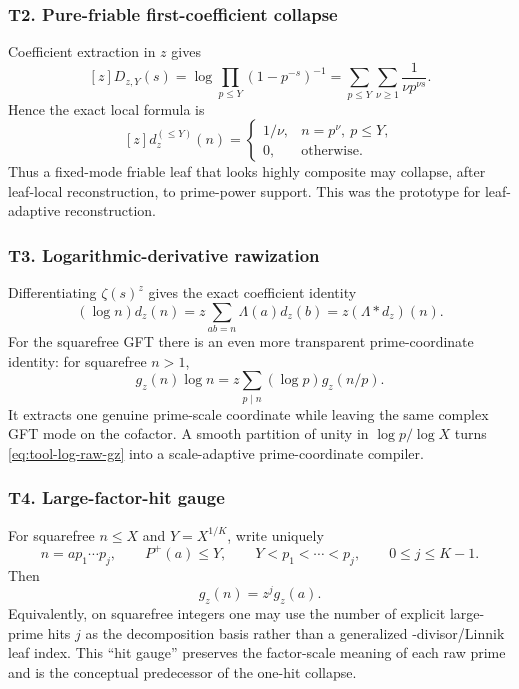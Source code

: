 \documentclass[11pt]{article}
\theoremstyle{definition}
\theoremstyle{remark}
\newcommand{\1}{\mathbf 1}
\begin{document}
\subsubsection*{T2. Pure-friable first-coefficient collapse}

Coefficient extraction in \(z\) gives
\[
 [z]D_{z,Y}(s)=\log\prod_{p\le Y}(1-p^{-s})^{-1}
 =\sum_{p\le Y}\sum_{\nu\ge1}\frac{1}{\nu p^{\nu s}}.
\]
Hence the exact local formula is
\begin{equation}\label{eq:tool-pure-friable-coeff}
 [z]d_z^{(\le Y)}(n)
 =
 \begin{cases}
  1/\nu,& n=p^\nu,\ p\le Y,\\
  0,&\text{otherwise}.
 \end{cases}
\end{equation}
Thus a fixed-mode friable leaf that looks highly composite may collapse, after
leaf-local reconstruction, to prime-power support.  This was the prototype for
leaf-adaptive reconstruction.

\subsubsection*{T3. Logarithmic-derivative rawization}

Differentiating \(\zeta(s)^z\) gives the exact coefficient identity
\begin{equation}\label{eq:tool-log-raw-dz}
 (\log n)d_z(n)
 =z\sum_{ab=n}\Lambda(a)d_z(b)
 =z(\Lambda*d_z)(n).
\end{equation}
For the squarefree GFT there is an even more transparent prime-coordinate
identity: for squarefree \(n>1\),
\begin{equation}\label{eq:tool-log-raw-gz}
 g_z(n)\log n
 =z\sum_{p\mid n}(\log p)g_z(n/p).
\end{equation}
It extracts one genuine prime-scale coordinate while leaving the same complex
GFT mode on the cofactor.  A smooth partition of unity in \(\log p/\log X\)
turns \eqref{eq:tool-log-raw-gz} into a scale-adaptive prime-coordinate
compiler.

\subsubsection*{T4. Large-factor-hit gauge}

For squarefree \(n\le X\) and \(Y=X^{1/K}\), write uniquely
\[
 n=a p_1\cdots p_j,
 \qquad P^+(a)\le Y,
 \qquad Y<p_1<\cdots<p_j,
 \qquad 0\le j\le K-1.
\]
Then
\begin{equation}\label{eq:tool-hit-gauge}
 g_z(n)=z^j g_z(a).
\end{equation}
Equivalently, on squarefree integers one may use the number of explicit
large-prime hits \(j\) as the decomposition basis rather than a generalized
-divisor/Linnik leaf index.  This ``hit gauge'' preserves the factor-scale
meaning of each raw prime and is the conceptual predecessor of the one-hit
collapse.
\end{document}
